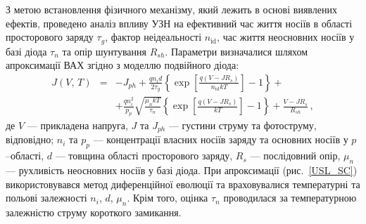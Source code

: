 З метою встановлення фізичного механізму,
який лежить в основі виявлених ефектів, проведено аналіз впливу УЗН на
ефективний час життя носіїв в області просторового заряду $\tau_{g}$,
фактор неідеальності $n_\mathrm{id}$,
час життя неосновних носіїв у базі діода $\tau_n$
та  опір шунтування $R_{sh}$.
Параметри визначалися шляхом апроксимації ВАХ згідно з моделлю подвійного діода:
\begin{eqnarray}
\label{eqSSCIV}
\nonumber J(V,\,T)&=&-J_{ph}+\frac{qn_id}{2\tau_{g}}\left\{\exp \left[\frac{q(V-JR_s)}{n_\mathrm{id}kT}\right]-1\right\}+\\
&&+\frac{qn_i^2}{p_p}\sqrt{\frac{\mu_nkT}{\tau_n}}\left\{\exp \left[\frac{q(V-JR_s)}{kT}\right]-1\right\}+\frac{V-JR_s}{R_{sh}}\,,
\end{eqnarray}
де
$V$ --- прикладена напруга,
$J$ та $J_{ph}$ --- густини струму та фотоструму, відповідно;
$n_i$ та $p_p$ --- концентрації власних носіїв заряду та основних носіїв у $p$--області,
$d$ --- товщина області просторового заряду,
$R_s$ --- послідовний опір,
$\mu_n$ --- рухливість неосновних носіїв у базі діода.
При апроксимації (рис.~\ref{USL_SC}) використовувався метод диференційної еволюції та враховувалися температурні та польові залежності $n_i$, $d$, $\mu_n$.
Крім того, оцінка $\tau_n$ проводилася за температурною залежністю струму короткого замикання.

